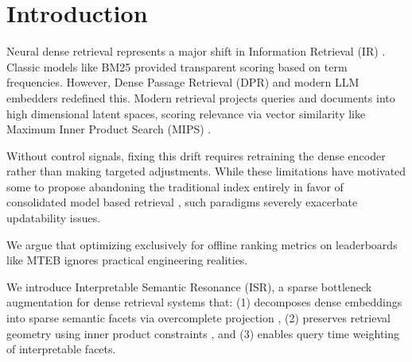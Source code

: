 \documentclass[sigconf,anonymous,screen]{acmart}
\begin{document}

\setlength{\abovedisplayskip}{4pt plus 2pt minus 2pt}
\setlength{\belowdisplayskip}{4pt plus 2pt minus 2pt}
\setlength{\abovedisplayshortskip}{2pt plus 1pt minus 1pt}
\setlength{\belowdisplayshortskip}{2pt plus 1pt minus 1pt}







\maketitle

\section{Introduction}
Neural dense retrieval represents a major shift in Information Retrieval (IR) \cite{lin2021pretrained}. Classic models like BM25 \cite{robertson2009probabilistic} provided transparent scoring based on term frequencies. However, Dense Passage Retrieval (DPR) \cite{karpukhin2020dense} and modern LLM embedders \cite{wang2024improving} redefined this. Modern retrieval projects queries and documents into high dimensional latent spaces, scoring relevance via vector similarity like Maximum Inner Product Search (MIPS) \cite{shrivastava2014}.

Without control signals, fixing this drift requires retraining the dense encoder rather than making targeted adjustments. While these limitations have motivated some to propose abandoning the traditional index entirely in favor of consolidated model based retrieval \cite{metzler2021rethinking}, such paradigms severely exacerbate updatability issues.

We argue that optimizing exclusively for offline ranking metrics on leaderboards like MTEB \cite{muennighoff2023mteb} ignores practical engineering realities.

We introduce Interpretable Semantic Resonance (ISR), a sparse bottleneck augmentation for dense retrieval systems that: (1) decomposes dense embeddings into sparse semantic facets via overcomplete projection \cite{faruqui2015sparse}, (2) preserves retrieval geometry using inner product constraints \cite{karpukhin2020dense}, and (3) enables query time weighting of interpretable facets.
\end{document}
